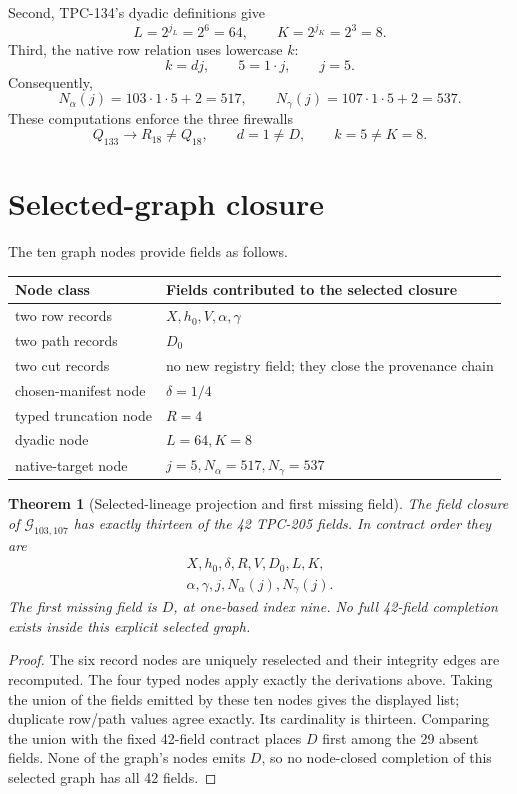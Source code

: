 \documentclass[11pt]{article}
\newtheorem{theorem}{Theorem}
\begin{document}
Second, TPC-134's dyadic definitions give
\[
 L=2^{j_L}=2^6=64,\qquad K=2^{j_K}=2^3=8.
\]
Third, the native row relation uses lowercase \(k\):
\[
 k=dj,\qquad 5=1\cdot j,\qquad j=5.
\]
Consequently,
\[
 N_\alpha(j)=103\cdot1\cdot5+2=517,\qquad
 N_\gamma(j)=107\cdot1\cdot5+2=537.
\]
These computations enforce the three firewalls
\[
 Q_{133}\to R_{18}\ne Q_{18},\qquad
 d=1\ne D,\qquad
 k=5\ne K=8.
\]

\section{Selected-graph closure}

The ten graph nodes provide fields as follows.
\begin{center}
\small
\begin{tabularx}{0.96\linewidth}{@{}l Y@{}}
\toprule
Node class & Fields contributed to the selected closure\\
\midrule
two row records & \(X,h_0,V,\alpha,\gamma\)\\
two path records & \(D_0\)\\
two cut records & no new registry field; they close the provenance chain\\
chosen-manifest node & \(\delta=1/4\)\\
typed truncation node & \(R=4\)\\
dyadic node & \(L=64,K=8\)\\
native-target node & \(j=5,N_\alpha=517,N_\gamma=537\)\\
\bottomrule
\end{tabularx}
\end{center}

\begin{theorem}[Selected-lineage projection and first missing field]
\label{thm:selected}
The field closure of \(\mathcal G_{103,107}\) has exactly thirteen of the
42 TPC-205 fields.  In contract order they are
\[
\begin{gathered}
 X,h_0,\delta,R,V,D_0,L,K,\\
 \alpha,\gamma,j,N_\alpha(j),N_\gamma(j).
\end{gathered}
\]
The first missing field is \(D\), at one-based index nine.  No full
42-field completion exists inside this explicit selected graph.
\end{theorem}

\begin{proof}
The six record nodes are uniquely reselected and their integrity edges are
recomputed.  The four typed nodes apply exactly the derivations above.
Taking the union of the fields emitted by these ten nodes gives the
displayed list; duplicate row/path values agree exactly.  Its cardinality is
thirteen.  Comparing the union with the fixed 42-field contract places
\(D\) first among the 29 absent fields.  None of the graph's nodes emits
\(D\), so no node-closed completion of this selected graph has all 42
fields.
\end{proof}
\end{document}
